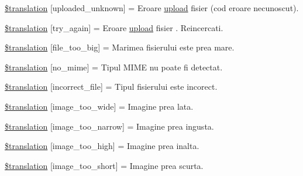 \begin{DoxyCompactItemize}
\item 
\hyperlink{class_8upload_8ro___r_o_8php_a4a9168e922b827e6a28b5db1c00774ca}{\$translation} \mbox{[}\textquotesingle{}uploaded\+\_\+unknown\textquotesingle{}\mbox{]} = \textquotesingle{}Eroare \hyperlink{classupload}{upload} fisier (cod eroare necunoscut).\textquotesingle{}
\item 
\hyperlink{class_8upload_8ro___r_o_8php_a3afc377bd803683314f413a814243066}{\$translation} \mbox{[}\textquotesingle{}try\+\_\+again\textquotesingle{}\mbox{]} = \textquotesingle{}Eroare \hyperlink{classupload}{upload} fisier . Reincercati.\textquotesingle{}
\item 
\hyperlink{class_8upload_8ro___r_o_8php_a476278eb4a0c3df56af068e2d511a741}{\$translation} \mbox{[}\textquotesingle{}file\+\_\+too\+\_\+big\textquotesingle{}\mbox{]} = \textquotesingle{}Marimea fisierului este prea mare.\textquotesingle{}
\item 
\hyperlink{class_8upload_8ro___r_o_8php_a191a55df8e3bb7f3c51b70f3c1932e02}{\$translation} \mbox{[}\textquotesingle{}no\+\_\+mime\textquotesingle{}\mbox{]} = \textquotesingle{}Tipul M\+I\+M\+E nu poate fi detectat.\textquotesingle{}
\item 
\hyperlink{class_8upload_8ro___r_o_8php_a4d32343e2699edd6fd435f9c832cb9c7}{\$translation} \mbox{[}\textquotesingle{}incorrect\+\_\+file\textquotesingle{}\mbox{]} = \textquotesingle{}Tipul fisierului este incorect.\textquotesingle{}
\item 
\hyperlink{class_8upload_8ro___r_o_8php_a0dd3e4930ca1f59ae280f4b1006525cd}{\$translation} \mbox{[}\textquotesingle{}image\+\_\+too\+\_\+wide\textquotesingle{}\mbox{]} = \textquotesingle{}Imagine prea lata.\textquotesingle{}
\item 
\hyperlink{class_8upload_8ro___r_o_8php_a5c9a4cd67fd21c32e0a3b434591a6037}{\$translation} \mbox{[}\textquotesingle{}image\+\_\+too\+\_\+narrow\textquotesingle{}\mbox{]} = \textquotesingle{}Imagine prea ingusta.\textquotesingle{}
\item 
\hyperlink{class_8upload_8ro___r_o_8php_aa27bde361343f3b63c7cd441860024f8}{\$translation} \mbox{[}\textquotesingle{}image\+\_\+too\+\_\+high\textquotesingle{}\mbox{]} = \textquotesingle{}Imagine prea inalta.\textquotesingle{}
\item 
\hyperlink{class_8upload_8ro___r_o_8php_a86fcd4e1157b00032df451188d735527}{\$translation} \mbox{[}\textquotesingle{}image\+\_\+too\+\_\+short\textquotesingle{}\mbox{]} = \textquotesingle{}Imagine prea scurta.\textquotesingle{}
\item 

\end{DoxyCompactItemize}
